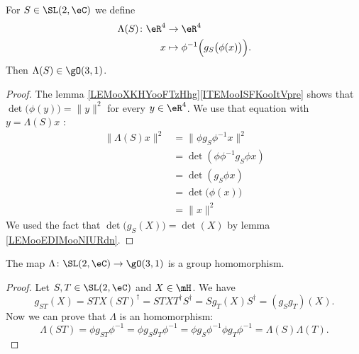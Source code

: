 \begin{lemma}       \label{LEMooXDPPooPImUQX}
    For \( S\in \SL(2,\eC)\) we define
    \begin{equation}
        \begin{aligned}
            \Lambda(S)\colon \eR^4&\to \eR^4 \\
            x&\mapsto \phi^{-1}\Big( g_S\big( \phi(x) \big) \Big). 
        \end{aligned}
    \end{equation}
    Then \( \Lambda(S)\in \gO(3,1)\).
\end{lemma}

\begin{proof}
    The lemma \ref{LEMooXKHYooFTzHhg}\ref{ITEMooISFKooItVpre} shows that \( \det\big( \phi(y) \big)=\| y \|^2\) for every \( y\in \eR^4\). We use that equation with \( y=\Lambda(S)x\) :
    \begin{subequations}
        \begin{align}
            \| \Lambda(S)x \|^2&=\| \phi g_S\phi^{-1} x \|^2\\
            &=\det(\phi\phi^{-1}g_S\phi x)\\
            &=\det(g_S\phi x)\\
            &=\det\big( \phi(x) \big)\\
            &=\| x \|^2
        \end{align}
    \end{subequations}
    We used the fact that \( \det\big( g_S(X) \big)=\det(X)\) by lemma \ref{LEMooEDIMooNIURdn}.
\end{proof}

\begin{lemma}           \label{LEMooJBYDooSFEUFr}
    The map \( \Lambda\colon \SL(2,\eC)\to \gO(3,1)\) is a group homomorphism.
\end{lemma}

\begin{proof}
    Let \( S,T\in \SL(2,\eC)\) and \( X\in \mH\). We have
    \begin{equation}
        g_{ST}(X)=STX(ST)^{\dag}=STXT^{\dag}S^{\dag}=Sg_T(X)S^{\dag}=(g_Sg_T)(X).
    \end{equation}
    Now we can prove that \( \Lambda\) is an homomorphism:
    \begin{equation}
        \Lambda(ST)=\phi g_{ST}\phi^{-1}=\phi g_Sg_T\phi^{-1}=\phi g_S\phi^{-1}\phi g_T\phi^{-1}=\Lambda(S)\Lambda(T).
    \end{equation}
\end{proof}

